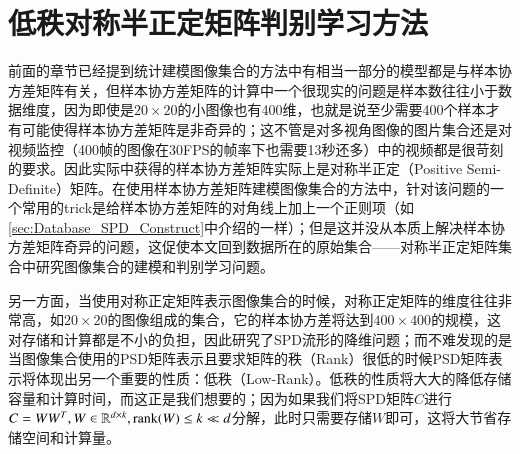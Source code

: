 \chapter{低秩对称半正定矩阵判别学习方法}
\label{chap:PSD_discrim_learning}
前面的章节已经提到统计建模图像集合的方法中有相当一部分的模型都是与样本协方差矩阵有关，但样本协方差矩阵的计算中一个很现实的问题是样本数往往小于数据维度，因为即使是$20\times 20$的小图像也有400维，也就是说至少需要400个样本才有可能使得样本协方差矩阵是非奇异的；这不管是对多视角图像的图片集合还是对视频监控（400帧的图像在30FPS的帧率下也需要13秒还多）中的视频都是很苛刻的要求。因此实际中获得的样本协方差矩阵实际上是对称半正定（Positive Semi-Definite）矩阵。在使用样本协方差矩阵建模图像集合的方法中，针对该问题的一个常用的trick是给样本协方差矩阵的对角线上加上一个正则项（如\ref{sec:Database_SPD_Construct}中介绍的一样）；但是这并没从本质上解决样本协方差矩阵奇异的问题，这促使本文回到数据所在的原始集合——对称半正定矩阵集合中研究图像集合的建模和判别学习问题。

另一方面，当使用对称正定矩阵表示图像集合的时候，对称正定矩阵的维度往往非常高，如$20 \times 20$的图像组成的集合，它的样本协方差将达到$400\times 400$的规模，这对存储和计算都是不小的负担，因此\cite{Statistics_SPDML,Statistics_LEML}研究了SPD流形的降维问题；而不难发现的是当图像集合使用的PSD矩阵表示且要求矩阵的秩（Rank）很低的时候PSD矩阵表示将体现出另一个重要的性质：低秩（Low-Rank）。低秩的性质将大大的降低存储容量和计算时间，而这正是我们想要的；因为如果我们将SPD矩阵$C$进行$C=WW^{T},W \in \mathbb{R}^{d\times k},{\rm rank}(W)\leq k \ll d$分解，此时只需要存储$W$即可，这将大节省存储空间和计算量。

